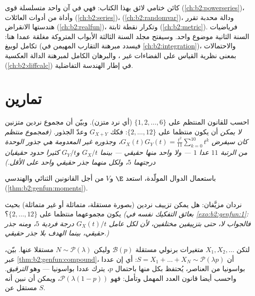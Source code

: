  كائن ختامي لائق بهذا الكتاب: فهي في آن واحد متسلسلة
قوى (\cref{ch:b2:powerseries})، وأداة من أدوات العائلات  (\cref{ch:b2:series})،  (\cref{ch:b2:randomvar})، ودالة محدبة تقرر هندستها الانقراض (\cref{ch:b2:realfun})، وتكرار
نقطة ثابتة (\cref{ch:b2:metric}). فرياضيات السنة الثانية موضوع واحد. وسيفتح
مجلد السنة الثالثة الأبواب المتروكة مغلقة عمدا هنا: تكامل لوبيغ
(فيسدد مبرهنة التقارب المهيمن في \cref{ch:b2:integration})، والاحتمالات بمعنى نظرية
القياس على الفضاءات غير ، والبرهان الكامل لمبرهنة الدالة
العكسية (\cref{ch:b2:diffcalc}) في إطار الهندسة التفاضلية.

\section{تمارين}

\begin{exercise}[$\star$]\label{exo:b2:genfun:1}
احسب  للقانون المنتظم على $\{1, 2,
\dots, 6\}$ (أي نرد متزن). وبيّن
أن مجموع نردين متزنين \emph{لا يمكن} أن يكون منتظما على $\{2, \dots, 12\}$:
فكك $G_{X+Y}$ وعدّ الجذور. \emph{(فمجموع منتظم كان سيفرض $G_X(t)G_Y(t) =
\frac{t^2}{11}\sum_{k=0}^{10}t^k$،
وجذوره غير المعدومة هي جذور الوحدة من الرتبة $11$ عدا $1$ ---
ولا واحد منها حقيقي --- بينما $G_X/t$ و$G_Y/t$ كثيرا حدود حقيقيان
درجتهما $5$، ولكل منهما جذر حقيقي واحد على الأقل.)}
\end{exercise}

\begin{exercise}[$\star$]\label{exo:b2:genfun:2}
باستعمال الدوال المولّدة، استعد $\E$ و$V$ من أجل القانونين
الثنائي والهندسي (\cref{thm:b2:genfun:moments}).
\end{exercise}

\begin{exercise}[$\star$]\label{exo:b2:genfun:3}
نردان مزيَّفان: هل يمكن تزييف نردين (بصورة مستقلة، متماثلة أو غير
متماثلة) بحيث يكون مجموعهما منتظما على $\{2, \dots,
12\}$؟ \emph{(بعائق التفكيك
نفسه في \cref{exo:b2:genfun:1}: فالجواب لا، حتى بتزييفين مختلفين، لأن لكل عامل
$G_X(t)/t$ درجة فردية $5$، ومنه جذر حقيقي، بينما الهدف بلا جذر
حقيقي.)}
\end{exercise}

\begin{exercise}[$\star\star$]\label{exo:b2:genfun:4}
لتكن $X_1, X_2, \dots$ متغيرات برنولي مستقلة $\mathcal{B}(p)$ وليكن $N \sim \mathcal{P}(\lambda)$ مستقلا عنها.
بيّن، عبر \cref{thm:b2:genfun:compound}، أن $S = X_1 + \dots + X_N
\sim \mathcal{P}(\lambda p)$: أي إن عددا بواسونيا من العناصر، يُحتفظ
بكل منها باحتمال $p$، يترك عددا بواسونيا --- وهو \emph{الترقيق}.
واحسب أيضا قانون العدد المهمل وتأمل: فهو $\mathcal{P}(\lambda(1-p))$، ويمكن أن نبين أنه
مستقل عن $S$.
\end{exercise}

